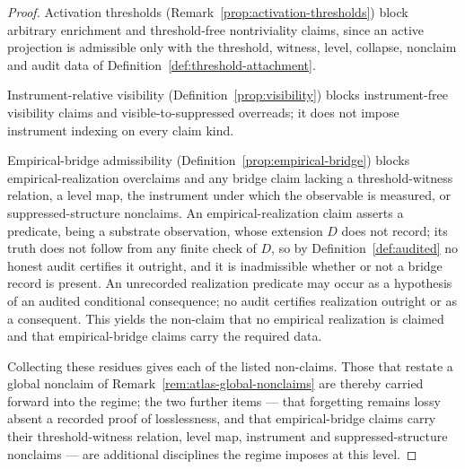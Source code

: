 \begin{proof}
Activation thresholds (Remark~\ref{prop:activation-thresholds}) block
arbitrary enrichment and threshold-free nontriviality claims, since an
active projection is admissible only with the threshold, witness, level,
collapse, nonclaim and audit data of Definition~\ref{def:threshold-attachment}.

Instrument-relative visibility (Definition~\ref{prop:visibility}) blocks
instrument-free visibility claims and visible-to-suppressed overreads; it does
not impose instrument indexing on every claim kind.

Empirical-bridge admissibility (Definition~\ref{prop:empirical-bridge})
blocks empirical-realization overclaims and any bridge claim lacking a
threshold-witness relation, a level map, the instrument under which the
observable is measured, or suppressed-structure nonclaims. An
empirical-realization claim asserts a predicate, being a substrate
observation, whose extension \(D\) does not record; its truth does not follow
from any finite check of \(D\), so by Definition~\ref{def:audited} no honest
audit certifies it outright, and it is inadmissible whether or not a bridge
record is present. An unrecorded realization predicate may occur as a
hypothesis of an audited conditional consequence; no audit certifies
realization outright or as a consequent. This yields the non-claim that no empirical realization
is claimed and that empirical-bridge claims carry the required data.

Collecting these residues gives each of the listed non-claims. Those that
restate a global nonclaim of Remark~\ref{rem:atlas-global-nonclaims} are
thereby carried forward into the regime; the two further items --- that
forgetting remains lossy absent a recorded proof of losslessness, and that
empirical-bridge claims carry their threshold-witness relation, level map,
instrument and suppressed-structure nonclaims --- are additional disciplines the regime imposes
at this level.
\end{proof}
